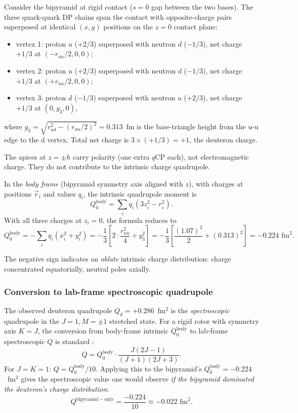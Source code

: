 \documentclass[11pt,letterpaper]{article}
\newcommand{\Qd}{Q_{d}}
\newcommand{\qCP}{q\mathrm{CP}}
\begin{document}
Consider the bipyramid at rigid contact ($s = 0$ gap between the two bases). The three quark-quark DP chains span the contact with opposite-charge pairs superposed at identical $(x, y)$ positions on the $z = 0$ contact plane:
\begin{itemize}
\item vertex 1: proton $u$ ($+2/3$) superposed with neutron $d$ ($-1/3$), net charge $+1/3$ at $(-r_{uu}/2, 0, 0)$;
\item vertex 2: proton $u$ ($+2/3$) superposed with neutron $d$ ($-1/3$), net charge $+1/3$ at $(+r_{uu}/2, 0, 0)$;
\item vertex 3: proton $d$ ($-1/3$) superposed with neutron $u$ ($+2/3$), net charge $+1/3$ at $(0, y_3, 0)$,
\end{itemize}
where $y_3 = \sqrt{r_{ud}^2 - (r_{uu}/2)^2} = 0.313$~fm is the base-triangle height from the u-u edge to the d vertex. Total net charge is $3 \times (+1/3) = +1$, the deuteron charge.

The apices at $z = \pm h$ carry polarity (one extra $\qCP$ each), not electromagnetic charge. They do not contribute to the intrinsic charge quadrupole.

In the \emph{body frame} (bipyramid symmetry axis aligned with $z$), with charges at positions $\vec r_i$ and values $q_i$, the intrinsic quadrupole moment is
\[
Q_0^{\mathrm{body}} = \sum_i q_i (3 z_i^2 - r_i^2).
\]
With all three charges at $z_i = 0$, the formula reduces to
\[
Q_0^{\mathrm{body}} = -\sum_i q_i (x_i^2 + y_i^2) = -\frac{1}{3}\left[2 \cdot \frac{r_{uu}^2}{4} + y_3^2\right] = -\frac{1}{3}\left[\frac{(1.07)^2}{2} + (0.313)^2\right] = -0.224 \text{ fm}^2.
\]

The negative sign indicates an \emph{oblate} intrinsic charge distribution: charge concentrated equatorially, neutral poles axially.

\subsubsection{Conversion to lab-frame spectroscopic quadrupole}

The observed deuteron quadrupole $\Qd = +0.286$~fm$^2$ \cite{pdg2024} is the \emph{spectroscopic} quadrupole in the $J=1, M=\pm 1$ stretched state. For a rigid rotor with symmetry axis $K = J$, the conversion from body-frame intrinsic $Q_0^{\mathrm{body}}$ to lab-frame spectroscopic $Q$ is standard \cite{krane_nuclear}:
\[
Q = Q_0^{\mathrm{body}} \cdot \frac{J(2J-1)}{(J+1)(2J+3)}.
\]
For $J = K = 1$: $Q = Q_0^{\mathrm{body}} / 10$. Applying this to the bipyramid's $Q_0^{\mathrm{body}} = -0.224$~fm$^2$ gives the spectroscopic value one would observe \emph{if the bipyramid dominated the deuteron's charge distribution}:
\[
Q^{\mathrm{bipyramid-only}} = \frac{-0.224}{10} \approx -0.022 \text{ fm}^2.
\]
\end{document}
